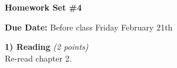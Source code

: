 

\def\xyprime{\ensuremath{\begin{pmatrix} x' \\ y' \end{pmatrix}}}



\thispagestyle{fancy}






\begin{center}
{\huge \textbf{Homework Set \#4}}
\large

{\textbf{ Due Date:} Before class Friday February 21th  }
\end{center}

\textbf{1) Reading } \hfill \textit{(2 points)}\\
Re-read chapter 2.

\vspace*{0.25in}


